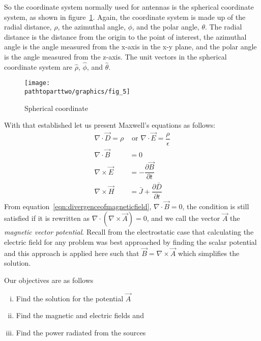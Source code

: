 So the coordinate system normally used for antennas is the spherical coordinate system, as shown in figure~\ref{fig:sphericalcoordinate}. Again, the coordinate system is made up of the radial distance, $\rho$, the azimuthal angle, $\phi$, and the polar angle, $\theta$. The radial distance is the distance from the origin to the point of interest, the azimuthal angle is the angle measured from the x-axis in the x-y plane, and the polar angle is the angle measured from the z-axis. The unit vectors in the spherical coordinate system are $\hat{\rho}$, $\hat{\phi}$, and $\hat{\theta}$.
\begin{figure}[h]
\centering
\texttt{[image: \\pathtoparttwo/graphics/fig\_5]}
\caption{Spherical coordinate}
\label{fig:sphericalcoordinate}
\end{figure}

With that established let us present Maxwell's equations as follows:
\begin{align}
\nabla\cdot\vec{D} =\rho&\text{ or }\nabla \cdot\vec{E} =\dfrac{\rho}{\epsilon}\label{eqn:gausslaw}\\
\nabla\cdot\vec{B}&=0\label{eqn:divergenceofmagneticfield}\\
\nabla\times\vec{E}&=- \dfrac{\partial\vec{B}}{\partial t}\label{eqn:faradayslaw}\\
\nabla\times\vec{H}&=\bar{J}+\dfrac{\partial\bar{D}}{\partial t}\label{eqn:ampereslaw}
\end{align}
From equation~\eqref{eqn:divergenceofmagneticfield}, $\nabla\cdot\vec{B}=0$, the condition is still satisfied if it is rewritten as $\nabla\cdot(\nabla\times\vec{A})=0$, and we call the vector $\vec{A}$ the \emph{magnetic vector potential}. Recall from the electrostatic case that calculating the electric field for any problem was best approached by finding the scalar potential and this approach is applied here such that $\vec{B}=\nabla\times\vec{A}$ which simplifies the solution.

Our objectives are as follows
\begin{enumerate}[(i)]
\item Find the solution for the potential $\vec{A}$
\item Find the magnetic and electric fields and
\item Find the power radiated from the sources
\end{enumerate}

